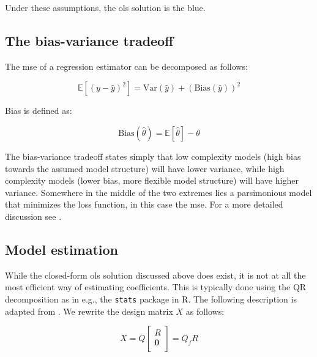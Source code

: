 \documentclass{report}
\begin{document}
Under these assumptions, the \gls{ols} solution is the \gls{blue}.

\subsection{The bias-variance tradeoff}\label{sec:bias-variance-tradeoff}

The \gls{mse} of a regression estimator can be decomposed as follows:

\begin{equation}\label{eq:bias-variance-tradeoff}
    \mathbb{E}\left[\left(y - \hat{y}\right)^2\right] = \text{Var}\left(\hat{y}\right) + \left(\text{Bias}\left(\hat{y}\right)\right)^2
\end{equation}

Bias is defined as:

\begin{equation}\label{eq:bias}
    \text{Bias}\left(\hat{\theta}\right) = \mathbb{E}\left[\hat{\theta}\right] - \theta
\end{equation}

The bias-variance tradeoff states simply that low complexity models (high bias towards the assumed model structure) will have lower variance, while high complexity models (lower bias, more flexible model structure) will have higher variance. Somewhere in the middle of the two extremes lies a parsimonious model that minimizes the loss function, in this case the \gls{mse}. For a more detailed discussion see \cite[Chapter~2.9]{hastie_elements_2009}. 

\subsection{Model estimation}

While the closed-form \gls{ols} solution discussed above does exist, it is not at all the most efficient way of estimating coefficients. This is typically done using the QR decomposition as in e.g., the \texttt{stats} package in R. The following description is adapted from \cite[Chapter~2.7]{faraway_linear_2015}. We rewrite the design matrix $X$ as follows:

\begin{equation}\label{eq:ols-qr-decomp}
    X = Q \begin{bmatrix}
        R \\
        \symbf{0} \\
    \end{bmatrix} = Q_fR 
\end{equation}
\end{document}
